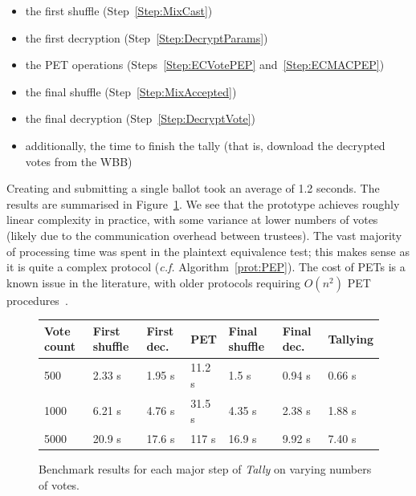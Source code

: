 \documentclass[12pt,a4paper]{article}
\theoremstyle{definition}
\begin{document}
\begin{itemize}
    \item the first shuffle (Step~\ref{Step:MixCast})
    \item the first decryption (Step~\ref{Step:DecryptParams})
    \item the PET operations (Steps~\ref{Step:ECVotePEP} and~\ref{Step:ECMACPEP})
    \item the final shuffle (Step~\ref{Step:MixAccepted})
    \item the final decryption (Step~\ref{Step:DecryptVote})
    \item additionally, the time to finish the tally (that is, download the decrypted votes from the WBB)
\end{itemize}

Creating and submitting a single ballot took an average of 1.2 seconds. The results are summarised in Figure~\ref{fig:benchmarks}. We see that the prototype achieves roughly linear complexity in practice, with some variance at lower numbers of votes (likely due to the communication overhead between trustees). The vast majority of processing time was spent in the plaintext equivalence test; this makes sense as it is quite a complex protocol (\textit{c.f.} Algorithm~\ref{prot:PEP}). The cost of PETs is a known issue in the literature, with older protocols requiring $O(n^2)$ PET procedures~\cite{juels2010coercion}.
\begin{figure}
        \begin{tabular}{l|llllll}
        Vote count & First shuffle & First dec. & PET & Final shuffle & Final dec. & Tallying \\ \hline
        500             & 2.33 s             & 1.95 s                & 11.2 s   & 1.5 s              & 0.94 s                & 0.66 s        \\
        1000            & 6.21 s             & 4.76 s                & 31.5 s   & 4.35 s             & 2.38 s                & 1.88 s        \\
        5000            & 20.9 s             & 17.6 s                & 117 s    & 16.9 s             & 9.92 s    
                    & 7.40 s       
        \end{tabular}
    \centering
    \caption{Benchmark results for each major step of \textit{Tally} on varying numbers of votes.}
    \label{fig:benchmarks}
\end{figure}
\end{document}
